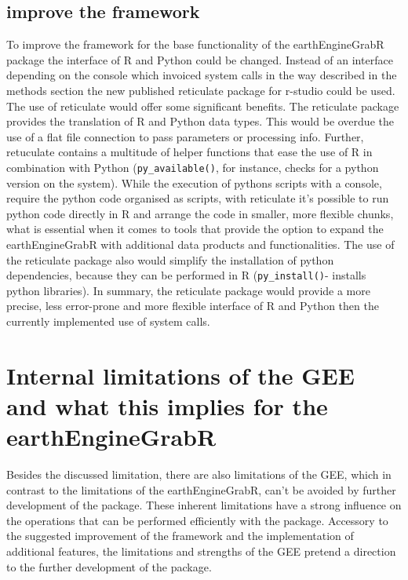 \subsection{improve the framework}

To improve the framework for the base functionality of the earthEngineGrabR package the interface of R and Python could be changed. Instead of an interface depending on the console which invoiced system calls in the way described in the methods section the new published reticulate package for r-studio could be used. The use of reticulate would offer some significant benefits. The reticulate package provides the translation of R and Python data types. This would be overdue the use of a flat file connection to pass parameters or processing info. Further, retuculate contains a multitude of helper functions that ease the use of R in combination with Python (\texttt{py\_available()}, for instance, checks for a python version on the system). While the execution of pythons scripts with a console, require the python code organised as scripts, with reticulate it's possible to run python code directly in R and arrange the code in smaller, more flexible chunks, what is essential when it comes to tools that provide the option to expand the earthEngineGrabR with additional data products and functionalities. The use of the reticulate package also would simplify the installation of python dependencies, because they can be performed in R (\texttt{py\_install()}- installs python libraries).
In summary, the reticulate package would provide a more precise, less error-prone and more flexible interface of R and Python then the currently implemented use of system calls.

\section{Internal limitations of the GEE and what this implies for the earthEngineGrabR}

Besides the discussed limitation, there are also limitations of the GEE, which in contrast to the limitations of the earthEngineGrabR, can't be avoided by further development of the package. 
These inherent limitations have a strong influence on the operations that can be performed efficiently with the package.
Accessory to the suggested improvement of the framework and the
implementation of additional features, the limitations and strengths of the GEE pretend a direction to the further development of the package.



